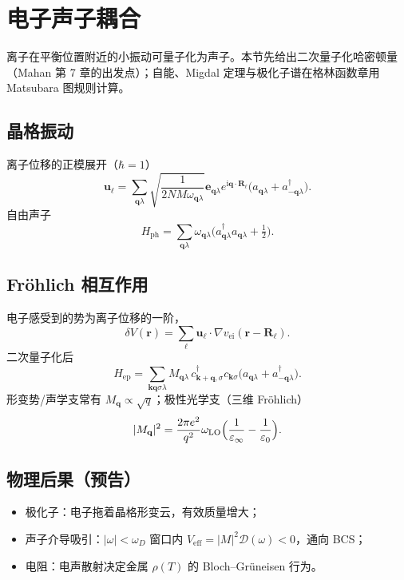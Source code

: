 \section{电子声子耦合}

离子在平衡位置附近的小振动可量子化为声子。本节先给出二次量子化哈密顿量（Mahan 第 7 章的出发点）；自能、Migdal 定理与极化子谱在格林函数章用 Matsubara 图规则计算。

\subsection{晶格振动}

离子位移的正模展开（$\hbar=1$）
\begin{equation}
  \mathbf{u}_{\ell}
  =\sum_{\mathbf{q}\lambda}
  \sqrt{\frac{1}{2NM\omega_{\mathbf{q}\lambda}}}
  \mathbf{e}_{\mathbf{q}\lambda}
  e^{\mathrm{i}\mathbf{q}\cdot\mathbf{R}_\ell}
  \bigl(a_{\mathbf{q}\lambda}+a_{-\mathbf{q}\lambda}^\dagger\bigr).
\end{equation}
自由声子
\begin{equation}
  H_{\mathrm{ph}}
  =\sum_{\mathbf{q}\lambda}
  \omega_{\mathbf{q}\lambda}
  \bigl(a_{\mathbf{q}\lambda}^\dagger a_{\mathbf{q}\lambda}+\tfrac12\bigr).
\end{equation}

\subsection{Fröhlich 相互作用}

电子感受到的势为离子位移的一阶，
\begin{equation}
  \delta V(\mathbf{r})
  =\sum_{\ell}\mathbf{u}_\ell\cdot\nabla v_{\mathrm{ei}}(\mathbf{r}-\mathbf{R}_\ell).
\end{equation}
二次量子化后
\begin{equation}
  H_{\mathrm{ep}}
  =\sum_{\mathbf{k}\mathbf{q}\sigma\lambda}
  M_{\mathbf{q}\lambda}\,
  c_{\mathbf{k}+\mathbf{q},\sigma}^\dagger c_{\mathbf{k}\sigma}
  \bigl(a_{\mathbf{q}\lambda}+a_{-\mathbf{q}\lambda}^\dagger\bigr).
\label{eq:frohlich}
\end{equation}
形变势/声学支常有 $M_{\mathbf{q}}\propto\sqrt{q}$；极性光学支（三维 Fröhlich）
\begin{equation}
  |M_{\mathbf{q}}|^2
  =\frac{2\pi e^2}{q^2}
  \omega_{\mathrm{LO}}
  \Bigl(\frac{1}{\varepsilon_\infty}-\frac{1}{\varepsilon_0}\Bigr).
\end{equation}

\subsection{物理后果（预告）}

\begin{itemize}
  \item 极化子：电子拖着晶格形变云，有效质量增大；
  \item 声子介导吸引：$\lvert\omega\rvert<\omega_D$ 窗口内 $V_{\mathrm{eff}}=|M|^2\mathcal{D}(\omega)<0$，通向 BCS；
  \item 电阻：电声散射决定金属 $\rho(T)$ 的 Bloch--Grüneisen 行为。
\end{itemize}
